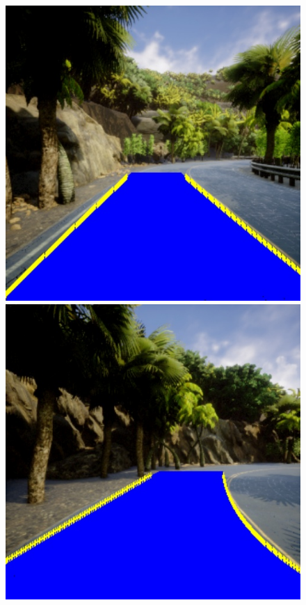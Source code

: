 \begin{figure}[H]
\begin{minipage}[t]{0.2\textwidth}
      \caption*{}
  \end{minipage}
  \hfill
  \begin{minipage}[t]{0.2\textwidth}
      \centering
      \includegraphics[width=\textwidth]{figs/Diseño/Regresiones/interpolación3.jpg}
      \caption*{}
  \end{minipage}
  \hfill
  \begin{minipage}[t]{0.2\textwidth}
      \centering
      \includegraphics[width=\textwidth]{figs/Diseño/Regresiones/interpolación4.jpg}
      \caption*{}
  \end{minipage}




\end{figure}

